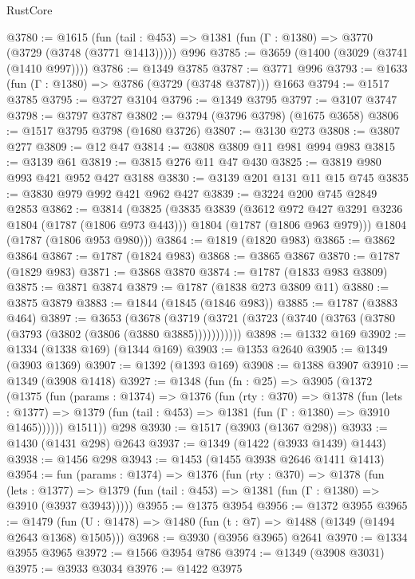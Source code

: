 \begin{lexlean}{RustCore}
\begin{coremodule}
@3780 := @1615
    (fun (tail : @453) => @1381 (fun (Γ : @1380) => @3770 (@3729 (@3748 (@3771 @1413)))))
    @996
@3785 := @3659 (@1400 (@3029 (@3741 (@1410 @997))))
@3786 := @1349 @3785
@3787 := @3771 @996
@3793 := @1633 (fun (Γ : @1380) => @3786 (@3729 (@3748 @3787))) @1663
@3794 := @1517 @3785
@3795 := @3727 @3104
@3796 := @1349 @3795
@3797 := @3107 @3747
@3798 := @3797 @3787
@3802 := @3794 (@3796 @3798) (@1675 @3658)
@3806 := @1517 @3795 @3798 (@1680 @3726)
@3807 := @3130 @273
@3808 := @3807 @277
@3809 := @12 @47
@3814 := @3808 @3809 @11 @981 @994 @983
@3815 := @3139 @61
@3819 := @3815 @276 @11 @47 @430
@3825 := @3819 @980 @993 @421 @952 @427 @3188
@3830 := @3139 @201 @131 @11 @15 @745
@3835 := @3830 @979 @992 @421 @962 @427
@3839 := @3224 @200 @745 @2849 @2853
@3862 := @3814
    (@3825
      (@3835
        @3839
        (@3612 @972 @427 @3291 @3236 @1804 (@1787 (@1806 @973 @443)))
        @1804
        (@1787 (@1806 @963 @979)))
      @1804
      (@1787 (@1806 @953 @980)))
@3864 := @1819 (@1820 @983)
@3865 := @3862 @3864
@3867 := @1787 (@1824 @983)
@3868 := @3865 @3867
@3870 := @1787 (@1829 @983)
@3871 := @3868 @3870
@3874 := @1787 (@1833 @983 @3809)
@3875 := @3871 @3874
@3879 := @1787 (@1838 @273 @3809 @11)
@3880 := @3875 @3879
@3883 := @1844 (@1845 (@1846 @983))
@3885 := @1787 (@3883 @464)
@3897 := @3653
    (@3678 (@3719 (@3721 (@3723 (@3740 (@3763 (@3780 (@3793 (@3802 (@3806 (@3880 @3885)))))))))))
@3898 := @1332 @169
@3902 := @1334 (@1338 @169) (@1344 @169)
@3903 := @1353 @2640
@3905 := @1349 (@3903 @1369)
@3907 := @1392 (@1393 @169)
@3908 := @1388 @3907
@3910 := @1349 (@3908 @1418)
@3927 := @1348
    (fun (fn : @25) =>
    @3905
      (@1372
        (@1375
          (fun (params : @1374) =>
          @1376
            (fun (rty : @370) =>
            @1378
              (fun (lets : @1377) =>
              @1379 (fun (tail : @453) => @1381 (fun (Γ : @1380) => @3910 @1465))))))
        @1511))
    @298
@3930 := @1517 (@3903 (@1367 @298))
@3933 := @1430 (@1431 @298) @2643
@3937 := @1349 (@1422 (@3933 @1439) @1443)
@3938 := @1456 @298
@3943 := @1453 (@1455 @3938 @2646 @1411 @1413)
@3954 := fun (params : @1374) =>
  @1376
    (fun (rty : @370) =>
    @1378
      (fun (lets : @1377) =>
      @1379 (fun (tail : @453) => @1381 (fun (Γ : @1380) => @3910 (@3937 @3943)))))
@3955 := @1375 @3954
@3956 := @1372 @3955
@3965 := @1479 (fun (U : @1478) => @1480 (fun (t : @7) => @1488 (@1349 (@1494 @2643 @1368) @1505)))
@3968 := @3930 (@3956 @3965) @2641
@3970 := @1334 @3955 @3965
@3972 := @1566 @3954 @786
@3974 := @1349 (@3908 @3031)
@3975 := @3933 @3034
@3976 := @1422 @3975

\end{coremodule}
\end{lexlean}
